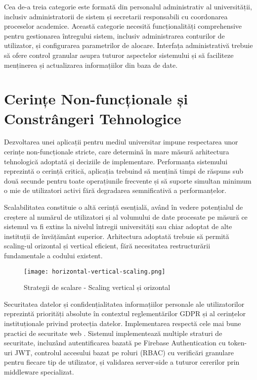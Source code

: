 \documentclass[12pt,a4paper]{report}
\begin{document}
Cea de-a treia categorie este formată din personalul administrativ al universității, inclusiv administratorii de sistem și secretarii responsabili cu coordonarea proceselor academice. Această categorie necesită funcționalități comprehensive pentru gestionarea întregului sistem, inclusiv administrarea conturilor de utilizator, și configurarea parametrilor de alocare. Interfața administrativă trebuie să ofere control granular asupra tuturor aspectelor sistemului și să faciliteze menținerea și actualizarea informațiilor din baza de date.

\section{Cerințe Non-funcționale și Constrângeri Tehnologice}

Dezvoltarea unei aplicații pentru mediul universitar impune respectarea unor cerințe non-funcționale stricte, care determină în mare măsură arhitectura tehnologică adoptată și deciziile de implementare. Performanța sistemului reprezintă o cerință critică, aplicația trebuind să mențină timpi de răspuns sub două secunde pentru toate operațiunile frecvente și să suporte simultan minimum o mie de utilizatori activi fără degradarea semnificativă a performanțelor.

Scalabilitatea constituie o altă cerință esențială, având în vedere potențialul de creștere al numărul de utilizatori și al volumului de date procesate pe măsură ce sistemul va fi extins la nivelul întregii universități sau chiar adoptat de alte instituții de învățământ superior. Arhitectura adoptată trebuie să permită scaling-ul orizontal și vertical eficient, fără necesitatea restructurării fundamentale a codului existent.

\begin{figure}[H]
\centering
\texttt{[image: horizontal-vertical-scaling.png]}
\caption{Strategii de scalare - Scaling vertical și orizontal}
\label{fig:scaling-strategies}
\end{figure}

Securitatea datelor și confidențialitatea informațiilor personale ale utilizatorilor reprezintă priorități absolute în contextul reglementărilor GDPR și al cerințelor instituționale privind protecția datelor. Implementarea respectă cele mai bune practici de securitate web \cite{owasp-top10}. Sistemul implementează multiple straturi de securitate, incluzând autentificarea bazată pe Firebase Authentication cu token-uri JWT, controlul accesului bazat pe roluri (RBAC) cu verificări granulare pentru fiecare tip de utilizator, și validarea server-side a tuturor cererilor prin middleware specializat.
\end{document}
